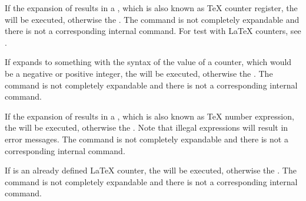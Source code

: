 \begin{Declaration}
\end{Declaration}
%
If the expansion of results in
a , which is also known as \TeX{} counter register, the
 will be executed, otherwise the . The command is not completely expandable and there is not a
corresponding internal command. For test with \LaTeX{} counters, see
.%
%

\begin{Declaration}
\end{Declaration}
%
If  expands to something with
the syntax of the value of a counter, which would be a negative or positive
integer, the  will be executed, otherwise the
. The command is not completely expandable and there
is not a corresponding internal command.%
%

\begin{Declaration}
\end{Declaration}
%
If the expansion of results in
a , which is also known as \TeX{} number expression, the
 will be executed, otherwise the . Note that illegal expressions will
result in error messages. The command is not completely expandable and there
is not a corresponding internal command.%
%

\begin{Declaration}
\end{Declaration}
%
If  is an already defined
\LaTeX{} counter, the  will be executed, otherwise
the .  The command is not completely expandable and
there is not a corresponding internal command.%
%

